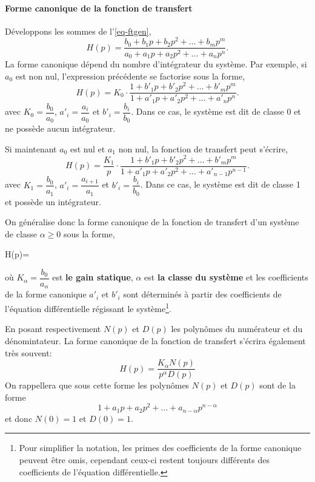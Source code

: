 \paragraph{Forme canonique de la fonction de transfert}
Développons les sommes de l'\cref{eq-ftgen},
$$
H(p)=\dfrac{b_0+b_1p+b_2p^2+\ldots+b_mp^m}{a_0+a_1p+a_2p^2+\ldots+a_np^n}.
$$
La forme canonique dépend du nombre d'intégrateur du système. 
Par exemple, si $a_0$ est non nul, l'expression précédente se factorise sous la forme,
$$
H(p)=K_0\cdot\dfrac{1+b'_1p+b'_2p^2+\ldots+b'_mp^m}{1+a'_1p+a'_2p^2+\ldots+a'_np^n}.
$$
avec $K_0=\dfrac{b_0}{a_0}$, $a'_i=\dfrac{a_i}{a_0}$ et $b'_i=\dfrac{b_i}{b_0}$. 
Dans ce cas, le système est dit de classe 0 et ne possède aucun intégrateur.

Si maintenant $a_0$ est nul et $a_1$ non nul, la fonction de transfert peut s'écrire,
$$
H(p)=\dfrac{K_1}{p}\cdot\dfrac{1+b'_1p+b'_2p^2+\ldots+b'_mp^m}{1+a'_1p+a'_2p^2+\ldots+a'_{n-1}p^{n-1}}.
$$
avec $K_1=\dfrac{b_0}{a_1}$, $a'_i=\dfrac{a_{i+1}}{a_1}$ et $b'_i=\dfrac{b_i}{b_0}$.
Dans ce cas, le système est dit de classe 1 et possède un intégrateur.

On généralise donc la forme canonique de la fonction de transfert d'un système de classe $\alpha\ge0$ sous la forme,
\begin{bequation}
H(p)=\cdot{} \label{eq-ftcan} 
\end{bequation}
où $K_\alpha=\dfrac{b_0}{a_\alpha}$ est \textbf{le gain statique}, $\alpha$ est \textbf{la classe du système} 
et les coefficients de la forme canonique $a'_i$ et $b'_i$ sont déterminés à partir des coefficients 
de l'équation différentielle régissant le système\footnote{Pour simplifier la notation, 
les primes des coefficients de la forme canonique peuvent être omis, cependant 
ceux-ci restent toujours différents des coefficients de l'équation différentielle.}.

En posant respectivement $N(p)$ et $D(p)$ les polynômes du numérateur et du dénomintateur.
La forme canonique de la fonction de transfert s'écrira également très souvent:
$$
H(p)=\dfrac{K_\alpha N(p)}{p^\alpha D(p)}
$$
On rappellera que sous cette forme les polynômes $N(p)$ et $D(p)$ sont de la forme 
$$
1+a_1p+a_2p^2+\ldots+a_{n-\alpha}p^{n-\alpha}
$$
et donc $N(0)=1$ et $D(0)=1$.


